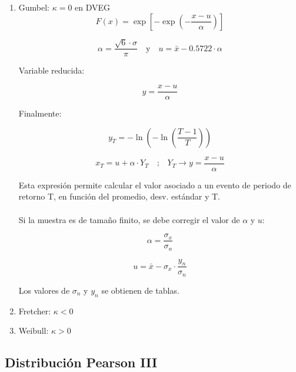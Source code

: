 \begin{enumerate}
    \item Gumbel: $\kappa = 0$ en DVEG
    \begin{equation}
        F(x) = \exp\left[-\exp\left(-\frac{x-u}{\alpha}\right)\right]
    \end{equation}
        
    \begin{equation}
        \alpha = \frac{\sqrt{6} \cdot \sigma}{\pi}
        \quad \text{y} \quad
        u = \bar{x} - 0.5722 \cdot \alpha
    \end{equation}

    Variable reducida:

    \begin{equation}
        y = \frac{x-u}{\alpha}
    \end{equation}

    Finalmente:

    \begin{equation}
        y_T = -\ln(-\ln\left(\frac{T-1}{T}\right))
    \end{equation}

    \begin{equation}
        x_T = u + \alpha \cdot Y_T
        \quad \text{;} \quad
        Y_T \rightarrow y = \frac{x-u}{\alpha} 
    \end{equation}

    Esta expresión permite calcular el valor asociado a un evento de periodo de retorno T, en función del promedio, desv. estándar y T.
    \\\\
    Si la muestra es de tamaño finito, se debe corregir el valor de $\alpha$ y $u$:

    \begin{equation}
        \alpha = \frac{\sigma_x}{\sigma_n}
    \end{equation}

    \begin{equation}
        u = \bar{x} - \sigma_x \cdot \frac{y_n}{\sigma_n}
    \end{equation}

    Los valores de $\sigma_n$ y $y_n$ se obtienen de tablas.

    \item Fretcher: $\kappa < 0$
    \item Weibull: $\kappa > 0$
\end{enumerate}

\subsection{Distribución Pearson III}

